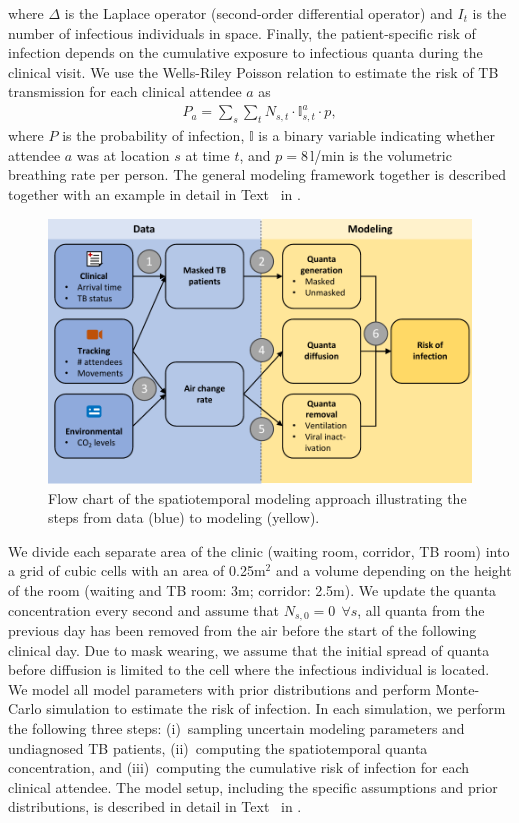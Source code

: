\documentclass[fleqn,11pt]{wlscirep}
\begin{document}
where $\Delta$ is the Laplace operator (second-order differential operator) and $I_t$ is the number of infectious individuals in space. Finally, the patient-specific risk of infection depends on the cumulative exposure to infectious quanta during the clinical visit. We use the Wells-Riley Poisson relation to estimate the risk of TB transmission for each clinical attendee $a$ as 
\begin{align}
    P_a = \sum_s \sum_t N_{s,t} \cdot \mathbb{I}_{s,t}^a \cdot p,
\end{align}
where $P$ is the probability of infection, $\mathbb{I}$ is a binary variable indicating whether attendee $a$ was at location $s$ at time $t$, and $p = 8$\,l/min is the volumetric breathing rate per person. The general modeling framework together is described together with an example in detail in Text~ in \supp. 

\begin{figure}[!htpb]
    \centering
    \includegraphics{doc/paper/flow-chart.pdf}
    \caption{Flow chart of the spatiotemporal modeling approach illustrating the steps from data (blue) to modeling (yellow).}
    \label{fig:modeling-flow}
\end{figure}

We divide each separate area of the clinic (waiting room, corridor, TB room) into a grid of cubic cells with an area of 0.25m$^2$ and a volume depending on the height of the room (waiting and TB room: 3m; corridor: 2.5m). We update the quanta concentration every second and assume that $N_{s,0} = 0 ~~ \forall s$, \ie all quanta from the previous day has been removed from the air before the start of the following clinical day. Due to mask wearing, we assume that the initial spread of quanta before diffusion is limited to the cell where the infectious individual is located. We model all model parameters with prior distributions and perform Monte-Carlo simulation to estimate the risk of infection. In each simulation, we perform the following three steps: (i)~sampling uncertain modeling parameters and undiagnosed TB patients, (ii)~computing the spatiotemporal quanta concentration, and (iii)~computing the cumulative risk of infection for each clinical attendee. The model setup, including the specific assumptions and prior distributions, is described in detail in Text~ in \supp.
\end{document}
